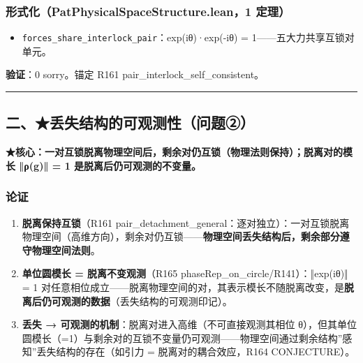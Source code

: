 \documentclass[
]{article}
\providecommand{\tightlist}{%
 \setlength{\itemsep}{0pt}\setlength{\parskip}{0pt}}
\begin{document}
\subsubsection{形式化（PatPhysicalSpaceStructure.lean，1
定理）}\label{ux5f62ux5f0fux5316patphysicalspacestructure.lean1-ux5b9aux7406}

\begin{itemize}
\tightlist
\item
 \texttt{forces\_share\_interlock\_pair}：exp(iθ)·exp(-iθ) =
 1------五大力共享互锁对单元。
\end{itemize}

\textbf{验证}：0 sorry。锚定 R161 pair\_interlock\_self\_consistent。

\begin{center}\rule{0.5\linewidth}{0.5pt}\end{center}

\subsection{二、★丢失结构的可观测性（问题②）}\label{ux4e8cux4e22ux5931ux7ed3ux6784ux7684ux53efux89c2ux6d4bux6027ux95eeux9898ux2461}

\textbf{★核心：一对互锁脱离物理空间后，剩余对仍互锁（物理法则保持）；脱离对的模长
‖ρ(g)‖ = 1 是脱离后仍可观测的不变量。}

\subsubsection{论证}\label{ux8bbaux8bc1-1}

\begin{enumerate}
\def\labelenumi{\arabic{enumi}.}
\tightlist
\item
 \textbf{脱离保持互锁}（R161
 pair\_detachment\_general：逐对独立）：一对互锁脱离物理空间（高维方向），剩余对仍互锁------\textbf{物理空间丢失结构后，剩余部分遵守物理空间法则}。
\item
 \textbf{单位圆模长 = 脱离不变观测}（R165
 phaseRep\_on\_circle/R141）：‖exp(iθ)‖ = 1
 对任意相位成立------脱离物理空间的对，其表示模长不随脱离改变，是\textbf{脱离后仍可观测的数据}（丢失结构的可观测印记）。
\item
 \textbf{丢失 → 可观测的机制}：脱离对进入高维（不可直接观测其相位
 θ），但其单位圆模长（=1）与剩余对的互锁不变量仍可观测------物理空间通过剩余结构''感知''丢失结构的存在（如引力
 = 脱离对的耦合效应，R164 CONJECTURE）。
\end{enumerate}
\end{document}
